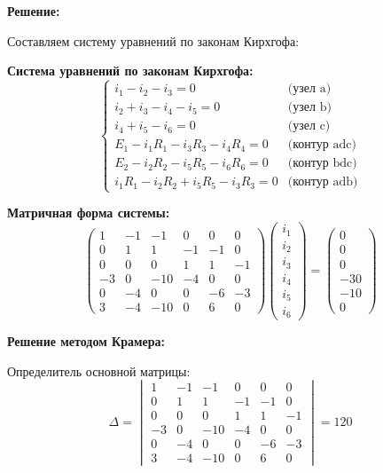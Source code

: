 \textbf{Решение:}

Составляем систему уравнений по законам Кирхгофа:

\textbf{Система уравнений по законам Кирхгофа:}
$$\begin{cases}
i_1 - i_2 - i_3 = 0 & \text{(узел a)} \\
i_2 + i_3 - i_4 - i_5 = 0 & \text{(узел b)} \\
i_4 + i_5 - i_6 = 0 & \text{(узел c)} \\
E_1 - i_1R_1 - i_3R_3 - i_4R_4 = 0 & \text{(контур adc)} \\
E_2 - i_2R_2 - i_5R_5 - i_6R_6 = 0 & \text{(контур bdc)} \\
i_1R_1 - i_2R_2 + i_5R_5 - i_3R_3 = 0 & \text{(контур adb)}
\end{cases}$$

\textbf{Матричная форма системы:}
$$\begin{pmatrix}
1 & -1 & -1 & 0 & 0 & 0 \\
0 & 1 & 1 & -1 & -1 & 0 \\
0 & 0 & 0 & 1 & 1 & -1 \\
-3 & 0 & -10 & -4 & 0 & 0 \\
0 & -4 & 0 & 0 & -6 & -3 \\
3 & -4 & -10 & 0 & 6 & 0
\end{pmatrix}
\begin{pmatrix}
i_1 \\
i_2 \\
i_3 \\
i_4 \\
i_5 \\
i_6
\end{pmatrix}
=
\begin{pmatrix}
0 \\
0 \\
0 \\
-30 \\
-10 \\
0
\end{pmatrix}$$

\textbf{Решение методом Крамера:}

Определитель основной матрицы:
$$\Delta = \begin{vmatrix}
1 & -1 & -1 & 0 & 0 & 0 \\
0 & 1 & 1 & -1 & -1 & 0 \\
0 & 0 & 0 & 1 & 1 & -1 \\
-3 & 0 & -10 & -4 & 0 & 0 \\
0 & -4 & 0 & 0 & -6 & -3 \\
3 & -4 & -10 & 0 & 6 & 0
\end{vmatrix} = 120$$

